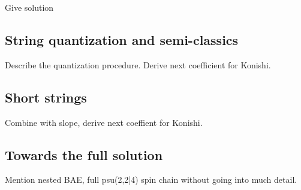 Give solution

\subsection{String quantization and semi-classics}

Describe the quantization procedure. Derive next coefficient for Konishi.

\subsection{Short strings}

Combine with slope, derive next coeffient for Konishi.

\subsection{Towards the full solution}

Mention nested BAE, full psu(2,2|4) spin chain without going into much detail.
